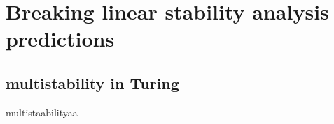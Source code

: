 \section{Breaking linear stability analysis predictions}

\subsection{multistability in Turing}
multistaabilityaa

\begin{adjustbox}{width=1.4\textwidth,center}
\begin{figure}
    \centering

\end{figure}
\end{adjustbox}
